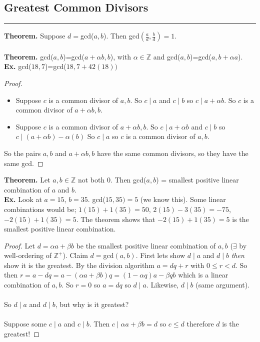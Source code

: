 \documentclass[class=article, crop=false]{standalone}
\def\integers{{\mathbb Z}}
\begin{document}
\subsection{Greatest Common Divisors}
\rule{\textwidth}{1pt}
\textbf{Theorem.} Suppose $d=$gcd($a,b$). Then gcd$\left(\frac{a}{d}, \frac{b}{d}\right)=1$.\\\\
\textbf{Theorem.} gcd($a,b$)=gcd($a+\alpha b,b$), with $\alpha\in\integers$ and gcd($a,b$)=gcd($a, b+\alpha a$).\\
\textbf{Ex.} gcd($18,7$)=gcd($18, 7+42(18))$
\begin{proof}
	$ $
	\begin{itemize}
		\item Suppose $c$ is a common divisor of $a,b$. So $c\mid a$ and $c\mid b$ so $c\mid a+\alpha b$.
		So $c$ is a common divisor of $a+\alpha b, b$.
		\item Suppose $c$ is a common divisor of $a+\alpha b, b$. So $c\mid a+\alpha b$ and $c\mid b$ so $c\mid (a+\alpha b)- \alpha(b)$
		So $c\mid a$ so $c$ is a common divisor of $a,b$. 
	\end{itemize}
	So the pairs $a,b$ and $a+\alpha b, b$ have the same common divisors,
	so they have the same gcd.
\end{proof}
\noindent\textbf{Theorem.} Let $a,b\in\integers$ not both $0$. Then gcd($a,b$) = smallest positive linear combination
of $a$ and $b$.\\
\textbf{Ex.} Look at $a=15$, $b=35$. gcd($15,35)=5$ (we know this). Some linear combinations would be; $1(15)+1(35)=50$,
$2(15)-3(35)=-75$, $-2(15)+1(35)=5$. The theorem shows that $-2(15)+1(35)=5$ is the smallest positive linear combination.
\begin{proof}
	Let $d=\alpha a+\beta b$ be the smallest positive linear combination of $a,b$ ($\exists$ by well-ordering of $\integers^+$).
	Claim $d=$gcd$(a,b)$.
	First lets show $d\mid a$ and $d\mid b$ \emph{then} show it is the greatest.
	By the division algorithm $a=dq+r$ with $0\leq r<d$. So then $r=a-dq=a-(\alpha a+\beta b)q=(1-\alpha q)a-\beta qb$
	which is a linear combination of $a,b$. So $r=0$ so $a=dq$ so $d\mid a$. Likewise, $d\mid b$ (same argument).\\\\
	So $d\mid a$ and $d\mid b$, but why is it greatest?\\\\
	Suppose some $c\mid a$ and $c\mid b$. Then $c\mid \alpha a + \beta b=d$ so $c\leq d$ therefore $d$ is the greatest!
\end{proof}
\end{document}
